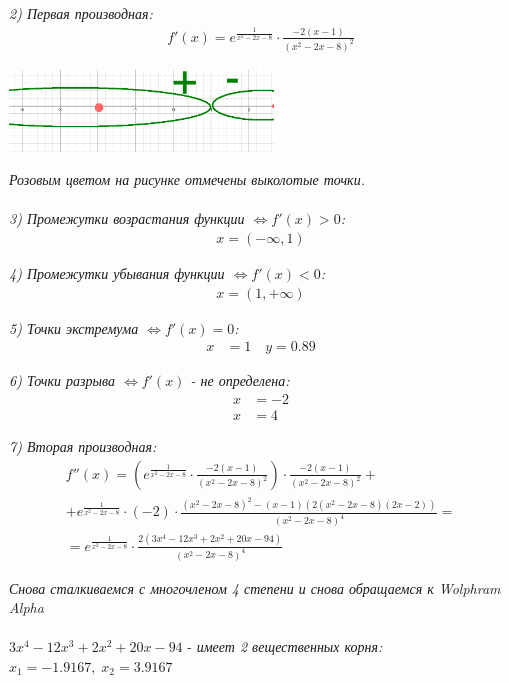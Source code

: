 \documentclass[a4paper,11pt]{article}
\begin{document}
\noindent  \textsl{2) Первая производная:}
\begin{gather*}
f'(x) =  e^{\frac{1}{x^2 - 2x - 8}} \cdot \frac{-2(x - 1)}{(x^2 - 2x - 8)^2}
\end{gather*} 
\begin{center}
	\includegraphics[width = 70mm]{images/732.png}
\end{center}
\noindent \textit{Розовым цветом на рисунке отмечены выколотые точки.} \\ \\

\noindent \textsl{3) Промежутки возрастания функции   $\Longleftrightarrow f'(x) > 0 $:}
\begin{gather*}
x = (-\infty, 1)
\end{gather*}

\noindent \textsl{4) Промежутки убывания функции   $\Longleftrightarrow f'(x) < 0 $:}
\begin{gather*}
x = (1, +\infty)
\end{gather*}

\noindent \textsl{5) Точки экстремума   $\Longleftrightarrow f'(x) = 0 $:}
\begin{align*}
x &= 1 \quad y = 0.89
\end{align*}

\noindent \textsl{6) Точки разрыва $ \Longleftrightarrow f'(x) $  - не определена:}
\begin{align*}
x &= -2 \\
x &= 4
\end{align*}

\noindent \textsl{7) Вторая производная:}
\begin{gather*}	
f''(x) =
(e^{\frac{1}{x^2 - 2x - 8}} \cdot \frac{-2(x - 1)}{(x^2 - 2x - 8)^2}) \cdot  \frac{-2(x - 1)}{(x^2 - 2x - 8)^2} + \\
+ e^{\frac{1}{x^2 - 2x - 8}}\cdot(-2)\cdot\frac{(x^2 - 2x - 8)^2 - (x - 1)(2(x^2 - 2x - 8)(2x - 2))}{(x^2 - 2x - 8)^4} = \\
= e^{\frac{1}{x^2 - 2x - 8}} \cdot \frac{2(3x^4 - 12x^3 + 2x^2 + 20x - 94)}{(x^2 - 2x - 8)^4}
\end{gather*}

\textit{\footnotesize Снова сталкиваемся с многочленом 4 степени и снова обращаемся к Wolphram Alpha} \\[4pt] \\
$ 3x^4 - 12x^3 + 2x^2 + 20x - 94 $ - \textit{имеет 2 вещественных корня: $ x_1 = -1.9167, \; x_2 = 3.9167 $}
\end{document}
